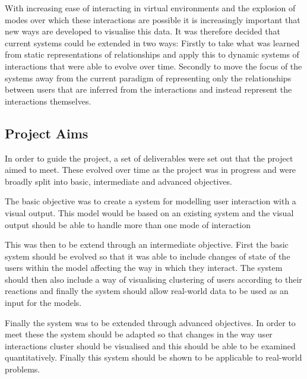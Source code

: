 \documentclass[12pt,a4paper]{article}
\begin{document}
With increasing ease of interacting in virtual environments and the explosion of modes over which these interactions are possible it is increasingly important that new ways are developed to visualise this data. It was therefore decided that current systems could be extended in two ways: Firstly to take what was learned from static representations of relationships and apply this to dynamic systems of interactions that were able to evolve over time. Secondly to move the focus of the systems away from the current paradigm of representing only the relationships between users that are inferred from the interactions and instead represent the interactions themselves.

\subsection{Project Aims}
\noindent
In order to guide the project, a set of deliverables were set out that the project aimed to meet. These evolved over time as the project was in progress and were broadly split into basic, intermediate and advanced objectives.

The basic objective was to create a system for modelling user interaction with a visual output. This model would be based on an existing system and the visual output should be able to handle more than one mode of interaction

This was then to be extend through an intermediate objective. First the basic system should be evolved so that it was able to include changes of state of the users within the model affecting the way in which they interact. The system should then also include a way of visualising clustering of users according to their reactions and finally the system should allow real-world data to be used as an input for the models.

Finally the system was to be extended through advanced objectives. In order to meet these the system should be adapted so that changes in the way user interactions cluster should be visualised and this should be able to be examined quantitatively. Finally this system should be shown to be applicable to real-world problems.
\end{document}
